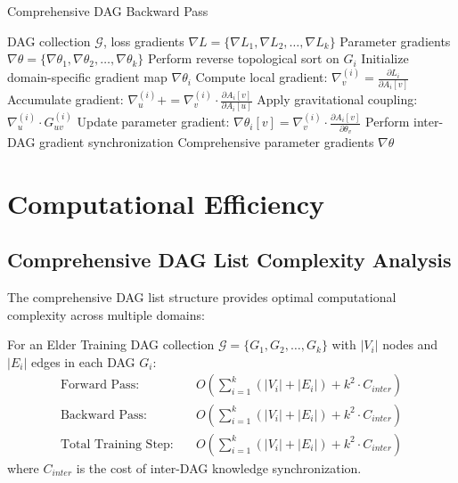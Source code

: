 \begin{algorithm}[H]
\caption{Comprehensive DAG Backward Pass}
\begin{algorithmic}[1]
\REQUIRE DAG collection $\mathcal{G}$, loss gradients $\nabla L = \{\nabla L_1, \nabla L_2, \ldots, \nabla L_k\}$
\ENSURE Parameter gradients $\nabla \theta = \{\nabla \theta_1, \nabla \theta_2, \ldots, \nabla \theta_k\}$
    \STATE Perform reverse topological sort on $G_i$
    \STATE Initialize domain-specific gradient map $\nabla \theta_i$
        \STATE Compute local gradient: $\nabla_v^{(i)} = \frac{\partial L_i}{\partial A_i[v]}$
            \STATE Accumulate gradient: $\nabla_u^{(i)} += \nabla_v^{(i)} \cdot \frac{\partial A_i[v]}{\partial A_i[u]}$
            \STATE Apply gravitational coupling: $\nabla_u^{(i)} \cdot G_{uv}^{(i)}$
        \ENDFOR
        \STATE Update parameter gradient: $\nabla \theta_i[v] = \nabla_v^{(i)} \cdot \frac{\partial A_i[v]}{\partial \theta_v}$
    \ENDFOR
\ENDFOR
\STATE Perform inter-DAG gradient synchronization
\RETURN Comprehensive parameter gradients $\nabla \theta$
\end{algorithmic}
\end{algorithm}

\section{Computational Efficiency}

\subsection{Comprehensive DAG List Complexity Analysis}

The comprehensive DAG list structure provides optimal computational complexity across multiple domains:

\begin{theorem}
For an Elder Training DAG collection $\mathcal{G} = \{G_1, G_2, \ldots, G_k\}$ with $|V_i|$ nodes and $|E_i|$ edges in each DAG $G_i$:
\begin{align}
\text{Forward Pass:} &\quad O\left(\sum_{i=1}^k (|V_i| + |E_i|) + k^2 \cdot C_{inter}\right) \\
\text{Backward Pass:} &\quad O\left(\sum_{i=1}^k (|V_i| + |E_i|) + k^2 \cdot C_{inter}\right) \\
\text{Total Training Step:} &\quad O\left(\sum_{i=1}^k (|V_i| + |E_i|) + k^2 \cdot C_{inter}\right)
\end{align}
where $C_{inter}$ is the cost of inter-DAG knowledge synchronization.
\end{theorem}

